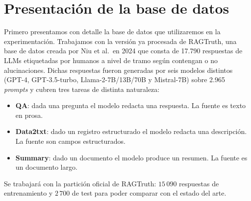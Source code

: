 \documentclass[12pt,a4paper]{report}
\theoremstyle{definition}
\begin{document}
\section{Presentación de la base de datos}

Primero presentamos con detalle la base de datos que utilizaremos en la experimentación. Trabajamos con la versión ya procesada de RAGTruth, una base de datos creada por Niu et al.\ en 2024 \cite{niu2024ragtruth} que consta de 17.790 respuestas de LLMs etiquetadas por humanos a nivel de tramo según contengan o no alucinaciones. Dichas respuestas fueron generadas por seis modelos distintos (GPT-4, GPT-3.5-turbo, Llama-2-7B/13B/70B y Mistral-7B) sobre 2.965 \emph{prompts} y cubren tres tareas de distinta naturaleza:

\begin{itemize}
  \item \textbf{QA}: dada una pregunta el modelo redacta una respuesta. La fuente es texto en prosa.
  \item \textbf{Data2txt}: dado un registro estructurado el modelo redacta una descripción. La
        fuente son campos estructurados.
  \item \textbf{Summary}: dado un documento el
        modelo produce un resumen. La fuente es un documento largo.
\end{itemize}

Se trabajará con la partición oficial de RAGTruth: $15\,090$ respuestas de entrenamiento y
$2\,700$ de test para poder comparar con el estado del arte.
\end{document}

